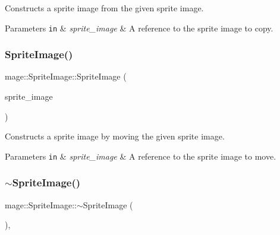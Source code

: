 Constructs a sprite image from the given sprite image.


\begin{DoxyParams}[1]{Parameters}
\mbox{\tt in}  & {\em sprite\+\_\+image} & A reference to the sprite image to copy. \\
\hline
\end{DoxyParams}
\hypertarget{classmage_1_1_sprite_image_ae1ea5c900498c8ecdf5dd3131d056dd5}{}\label{classmage_1_1_sprite_image_ae1ea5c900498c8ecdf5dd3131d056dd5} 
\subsubsection{\texorpdfstring{Sprite\+Image()}{SpriteImage()}\hspace{0.1cm}{\footnotesize\ttfamily [6/6]}}
{\footnotesize\ttfamily mage\+::\+Sprite\+Image\+::\+Sprite\+Image (\begin{DoxyParamCaption}\item[{\hyperlink{classmage_1_1_sprite_image}{Sprite\+Image} \&\&}]{sprite\+\_\+image }\end{DoxyParamCaption})\hspace{0.3cm}{\ttfamily [default]}}

Constructs a sprite image by moving the given sprite image.


\begin{DoxyParams}[1]{Parameters}
\mbox{\tt in}  & {\em sprite\+\_\+image} & A reference to the sprite image to move. \\
\hline
\end{DoxyParams}
\hypertarget{classmage_1_1_sprite_image_a9121ee110f7e64ee6e936e0d3350ab44}{}\label{classmage_1_1_sprite_image_a9121ee110f7e64ee6e936e0d3350ab44} 
\subsubsection{\texorpdfstring{$\sim$\+Sprite\+Image()}{~SpriteImage()}}
{\footnotesize\ttfamily mage\+::\+Sprite\+Image\+::$\sim$\+Sprite\+Image (\begin{DoxyParamCaption}{ }\end{DoxyParamCaption})\hspace{0.3cm}{\ttfamily [virtual]}, {\ttfamily [default]}}

